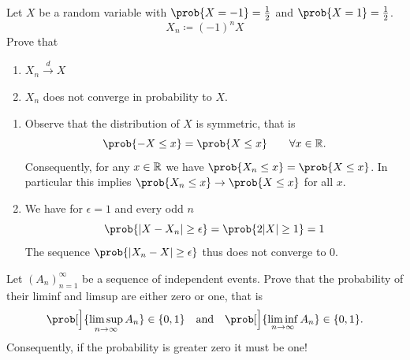 \documentclass[11pt]{article}
\begin{document}
\maketitle



\begin{exercise}[subtitle={Convergence in distribution but not probability}]
    \label{ex: convergence in distribution but not in probability}
    Let \(X\) be a random variable with \(\prob{X=-1} = \frac12\) and \(\prob{X=1}=\frac12\).
    \[
        X_n \coloneq (-1)^n X
    \]
    Prove that
    \begin{enumerate}[label=(\alph*), noitemsep]
        \item\label{it: (conv in dist but not in prob) in dist} \(X_n \xrightarrow{d} X\)
        \item \label{it: (conv in dist but not in prob) not in prob}\(X_n\) does not converge in probability to \(X\).
    \end{enumerate}
\end{exercise}

\begin{solution}
\begin{enumerate}[wide=0pt]
    \item[\ref{it: (conv in dist but not in prob) in dist}]
    Observe that the distribution of \(X\) is symmetric, that is
    \[
        \prob{-X \le x} = \prob{X \le x} \qquad \forall x\in \real.
    \]
    Consequently, for any \(x \in \mathbb{R}\) we have \(\prob{X_n \le x} = \prob{X \le x}\).
    In particular this implies \(\prob{X_n \le x} \to \prob{X \le x}\) for all \(x\).

    \item[\ref{it: (conv in dist but not in prob) not in prob}]
    We have for \(\epsilon = 1\) and every odd \(n\)
    \[
        \prob{\abs{X - X_n} \ge \epsilon}
        = \prob{2\abs{X} \ge 1} = 1
    \]
    The sequence \(\prob{|X_n - X| \ge \epsilon}\) thus does not converge to \(0\).
    \qedhere
\end{enumerate}
\end{solution}




\begin{exercise}[subtitle={Borel's \(0\)-\(1\) law}]
    \label{ex: borel cantelli 0-1 law}
    Let \((A_n)_{n=1}^\infty\) be a sequence of independent events. Prove that 
    the probability of their liminf and limsup are either zero or one, that is
    \[
        \prob[\Big]{\limsup_{n\to \infty} A_n} \in \{0,1\}
        \quad\text{and}\quad
        \prob[\Big]{\liminf_{n\to \infty} A_n} \in \{0,1\}.
    \]
    Consequently, if the probability is greater zero it must be one!
\end{exercise}
\end{document}
